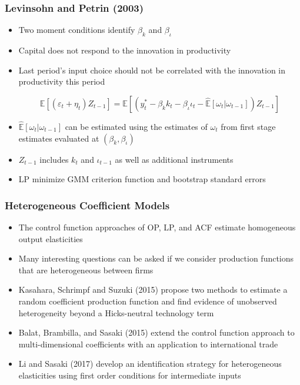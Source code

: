 \documentclass{beamer}
\begin{document}
\begin{frame}
\begin{itemize}

\begin{frame}
\frametitle{Levinsohn and Petrin (2003)}
\begin{itemize}
	\item Two moment conditions identify $\beta_{k}$ and $\beta_{\iota}$
	\item Capital does not respond to the innovation in productivity 
	\item Last period's input choice should not be correlated with the innovation in productivity this period
	
	\begin{equation}
	\mathbb{E}[(\varepsilon_{t}+\eta_{t})Z_{t-1}]=\mathbb{E}[(y_{t}^{*}-\beta_{k}k_{t}-\beta_{\iota}\iota_{t}-\hat{\mathbb{E}}[\omega_{t}|\omega_{t-1}])Z_{t-1}]
	\end{equation}
	
	\item $\hat{\mathbb{E}}[\omega_{t}|\omega_{t-1}]$ can be estimated using the estimates of $\omega_{t}$ from first stage estimates evaluated at $(\beta_{k}, \beta_{\iota})$
	\item $Z_{t-1}$ includes $k_{t}$ and $\iota_{t-1}$ as well as additional instruments
	\item LP minimize GMM criterion function and bootstrap standard errors 
\end{itemize}
\end{frame}



\begin{frame}
\frametitle{Heterogeneous Coefficient Models}
\begin{itemize}
	\item The control function approaches of OP, LP, and ACF estimate homogeneous output elasticities
	\item Many interesting questions can be asked if we consider production functions that are heterogeneous between firms
	\item Kasahara, Schrimpf and Suzuki (2015) propose two methods to estimate a random coefficient production function and find evidence of unobserved heterogeneity beyond a Hicks-neutral technology term
	\item Balat, Brambilla, and Sasaki (2015) extend the control function approach to multi-dimensional coefficients with an application to international trade
	\item Li and Sasaki (2017) develop an identification strategy for heterogeneous elasticities using first order conditions for intermediate inputs
\end{itemize}
\end{frame}


\end{itemize}
\end{frame}
\end{document}
